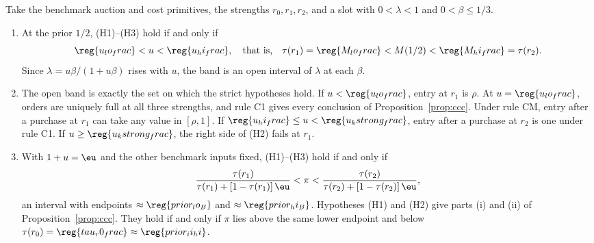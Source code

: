 \begin{proposition}\label{prop:region}
Take the benchmark auction and cost primitives, the strengths \(r_0,r_1,r_2\), and a slot with \(0<\lambda<1\) and
\(0<\beta\le1/3\).
\begin{enumerate}[label=(\alph*),leftmargin=2em]
\item At the prior \(1/2\), (H1)--(H3) hold if and only if
\[
\reg{u_lo_frac}<u<\reg{u_hi_frac},\quad\text{that is,}\quad
\tau(r_1)=\reg{M_lo_frac}<M(1/2)<\reg{M_hi_frac}=\tau(r_2).
\]
Since \(\lambda=u\beta/(1+u\beta)\) rises with \(u\), the band is an open interval of \(\lambda\) at each
\(\beta\).
\item The open band is exactly the set on which the strict hypotheses hold. If \(u<\reg{u_lo_frac}\), entry at
\(r_1\) is \(\rho\). At \(u=\reg{u_lo_frac}\), orders are uniquely full at all three strengths, and rule C1 gives
every conclusion of Proposition~\ref{prop:ccc}. Under rule CM, entry after a purchase at \(r_1\) can take any value
in \([\rho,1]\). If \(\reg{u_hi_frac}\le u<\reg{u_kstrong_frac}\), entry after a purchase at \(r_2\) is one under
rule C1. If \(u\ge\reg{u_kstrong_frac}\), the right side of (H2) fails at \(r_1\).
\item With \(1+u=\eu\) and the other benchmark inputs fixed, (H1)--(H3) hold if and only if
\[
\frac{\tau(r_1)}{\tau(r_1)+[1-\tau(r_1)]\,\eu}<\pi<\frac{\tau(r_2)}{\tau(r_2)+[1-\tau(r_2)]\,\eu},
\]
an interval with endpoints \(\approx\reg{prior_lo_B}\) and \(\approx\reg{prior_hi_B}\). Hypotheses (H1) and (H2)
give parts (i) and (ii) of Proposition~\ref{prop:ccc}. They hold if and only if \(\pi\) lies above the same lower
endpoint and below \(\tau(r_0)=\reg{tau_r0_frac}\approx\reg{prior_ii_hi}\).
\end{enumerate}
\end{proposition}


